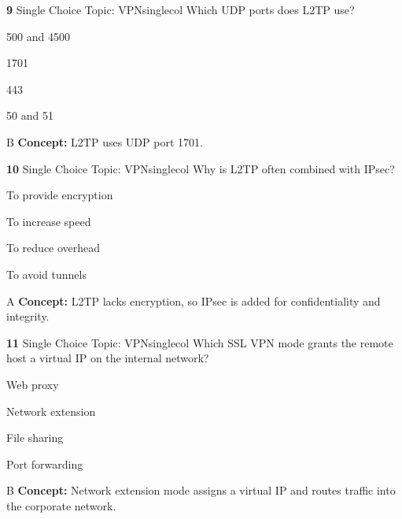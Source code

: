 \documentclass[10pt,a4paper]{article}
\begin{document}
\begin{qcard}{\color{white}\textbf{9} \hfill \small Single Choice \textbar{} Topic: VPN}{singlecol}
Which UDP ports does L2TP use?

\begin{qoptions}
\item 500 and 4500
\item 1701
\item 443
\item 50 and 51
\end{qoptions}
\begin{explainbox}{B}
\textbf{Concept:} L2TP uses UDP port 1701.
\end{explainbox}
\end{qcard}

\begin{qcard}{\color{white}\textbf{10} \hfill \small Single Choice \textbar{} Topic: VPN}{singlecol}
Why is L2TP often combined with IPsec?

\begin{qoptions}
\item To provide encryption
\item To increase speed
\item To reduce overhead
\item To avoid tunnels
\end{qoptions}
\begin{explainbox}{A}
\textbf{Concept:} L2TP lacks encryption, so IPsec is added for confidentiality and integrity.
\end{explainbox}
\end{qcard}

\begin{qcard}{\color{white}\textbf{11} \hfill \small Single Choice \textbar{} Topic: VPN}{singlecol}
Which SSL VPN mode grants the remote host a virtual IP on the internal network?

\begin{qoptions}
\item Web proxy
\item Network extension
\item File sharing
\item Port forwarding
\end{qoptions}
\begin{explainbox}{B}
\textbf{Concept:} Network extension mode assigns a virtual IP and routes traffic into the corporate network.
\end{explainbox}
\end{qcard}
\end{document}
